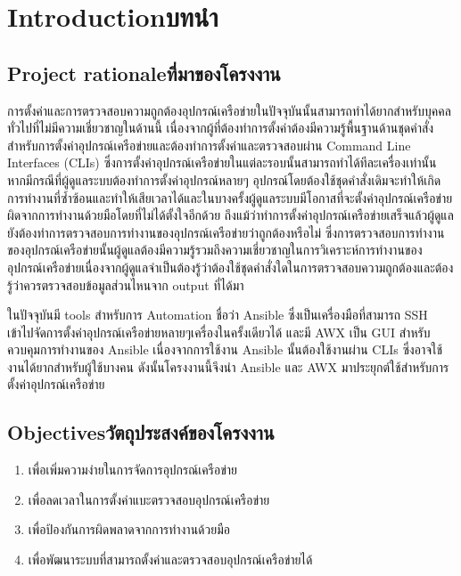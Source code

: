 \chapter{\ifenglish Introduction\else บทนำ\fi}

\section{\ifenglish Project rationale\else ที่มาของโครงงาน\fi}
\hspace{0.5in}
การตั้งค่าและการตรวจสอบความถูกต้องอุปกรณ์เครือข่ายในปัจจุบันนั้นสามารถทำได้ยากสำหรับบุคคลทั่วไปที่ไม่มีความเชี่ยวชาญในด้านนี้ เนื่องจากผู้ที่ต้องทำการตั้งค่าต้องมีความรู้พื้นฐานด้านชุดคำสั่งสำหรับการตั้งค่าอุปกรณ์เครือข่ายและต้องทำการตั้งค่าและตรวจสอบผ่าน Command Line Interfaces (CLIs) ซึ่งการตั้งค่าอุปกรณ์เครือข่ายในแต่ละรอบนั้นสามารถทำได้ทีละเครื่องเท่านั้น หากมีกรณีที่ผู้ดูแลระบบต้องทำการตั้งค่าอุปกรณ์หลายๆ อุปกรณ์โดยต้องใช้ชุดคำสั่งเดิมจะทำให้เกิดการทำงานที่ซ้ำซ้อนและทำให้เสียเวลาได้และในบางครั้งผู้ดูแลระบบมีโอกาสที่จะตั้งค่าอุปกรณ์เครือข่ายผิดจากการทำงานด้วยมือโดยที่ไม่ได้ตั้งใจอีกด้วย
ถึงแม้ว่าทำการตั้งค่าอุปกรณ์เครือข่ายเสร็จแล้วผู้ดูแลยังต้องทำการตรวจสอบการทำงานของอุปกรณ์เครือข่ายว่าถูกต้องหรือไม่ ซึ่งการตรวจสอบการทำงานของอุปกรณ์เครือข่ายนั้นผู้ดูแลต้องมีความรู้รวมถึงความเชี่ยวชาญในการวิเคราะห์การทำงานของอุปกรณ์เครือข่ายเนื่องจากผู้ดูแลจำเป็นต้องรู้ว่าต้องใช้ชุดคำสั่งใดในการตรวจสอบความถูกต้องและต้องรู้ว่าควรตรวจสอบข้อมูลส่วนไหนจาก output ที่ได้มา

\hspace{0.5in}
ในปัจจุบันมี tools สำหรับการ Automation ชื่อว่า Ansible ซึ่งเป็นเครื่องมือที่สามารถ SSH เข้าไปจัดการตั้งค่าอุปกรณ์เครือข่ายหลายๆเครื่องในครั้งเดียวได้ และมี AWX เป็น GUI สำหรับควบคุมการทำงานของ Ansible เนื่องจากการใช้งาน Ansible นั้นต้องใช้งานผ่าน CLIs ซึ่งอาจใช้งานได้ยากสำหรับผู้ใช้บางคน
ดังนั้นโครงงานนี้จึงนำ Ansible และ AWX มาประยุกต์ใช้สำหรับการตั้งค่าอุปกรณ์เครือข่าย
\section{\ifenglish Objectives\else วัตถุประสงค์ของโครงงาน\fi}
\begin{enumerate}
    \item {เพื่อเพิ่มความง่ายในการจัดการอุปกรณ์เครือข่าย}
    \item {เพื่อลดเวลาในการตั้งค่าแบะตรวจสอบอุปกรณ์เครือข่าย}
    \item {เพื่อป้องกันการผิดพลาดจากการทำงานด้วยมือ}
    \item {เพื่อพัฒนาระบบที่สามารถตั้งค่าและตรวจสอบอุปกรณ์เครือข่ายได้}
\end{enumerate}

